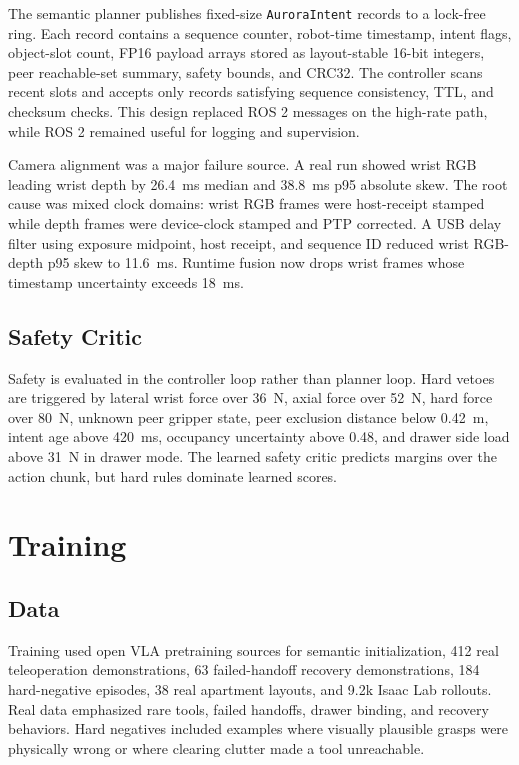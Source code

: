 \documentclass[10pt,twocolumn]{article}
\begin{document}
The semantic planner publishes fixed-size \texttt{AuroraIntent} records to a lock-free ring. Each record contains a sequence counter, robot-time timestamp, intent flags, object-slot count, FP16 payload arrays stored as layout-stable 16-bit integers, peer reachable-set summary, safety bounds, and CRC32. The controller scans recent slots and accepts only records satisfying sequence consistency, TTL, and checksum checks. This design replaced ROS 2 messages on the high-rate path, while ROS 2 remained useful for logging and supervision.

Camera alignment was a major failure source. A real run showed wrist RGB leading wrist depth by \SI{26.4}{ms} median and \SI{38.8}{ms} p95 absolute skew. The root cause was mixed clock domains: wrist RGB frames were host-receipt stamped while depth frames were device-clock stamped and PTP corrected. A USB delay filter using exposure midpoint, host receipt, and sequence ID reduced wrist RGB-depth p95 skew to \SI{11.6}{ms}. Runtime fusion now drops wrist frames whose timestamp uncertainty exceeds \SI{18}{ms}.

\subsection{Safety Critic}

Safety is evaluated in the controller loop rather than planner loop. Hard vetoes are triggered by lateral wrist force over \SI{36}{N}, axial force over \SI{52}{N}, hard force over \SI{80}{N}, unknown peer gripper state, peer exclusion distance below \SI{0.42}{m}, intent age above \SI{420}{ms}, occupancy uncertainty above 0.48, and drawer side load above \SI{31}{N} in drawer mode. The learned safety critic predicts margins over the action chunk, but hard rules dominate learned scores.

\section{Training}

\subsection{Data}

Training used open VLA pretraining sources for semantic initialization, 412 real teleoperation demonstrations, 63 failed-handoff recovery demonstrations, 184 hard-negative episodes, 38 real apartment layouts, and 9.2k Isaac Lab rollouts. Real data emphasized rare tools, failed handoffs, drawer binding, and recovery behaviors. Hard negatives included examples where visually plausible grasps were physically wrong or where clearing clutter made a tool unreachable.
\end{document}
